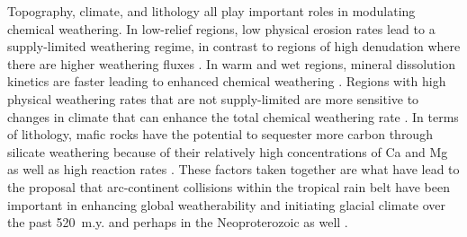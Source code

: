 \documentclass[11pt,letterpaper]{article}
\begin{document}
Topography, climate, and lithology all play important roles in modulating chemical weathering. In low-relief regions, low physical erosion rates lead to a supply-limited weathering regime, in contrast to regions of high denudation where there are higher weathering fluxes \citep{Gabet2009a, West2012a, Maher2014a}. In warm and wet regions, mineral dissolution kinetics are faster leading to enhanced chemical weathering \citep{Lasaga1994a, West2012a}. Regions with high physical weathering rates that are not supply-limited are more sensitive to changes in climate that can enhance the total chemical weathering rate \citep{West2012a, Maher2014a}. In terms of lithology, mafic rocks have the potential to sequester more carbon through silicate weathering because of their relatively high concentrations of Ca and Mg as well as high reaction rates \citep{Dessert2003a}. These factors taken together are what have lead to the proposal that arc-continent collisions within the tropical rain belt have been important in enhancing global weatherability and initiating glacial climate over the past 520~m.y. \citep{Jagoutz2016a, Swanson-Hysell2017a, Macdonald2019a} and perhaps in the Neoproterozoic as well \citep{Park2019a}.

\end{document}
